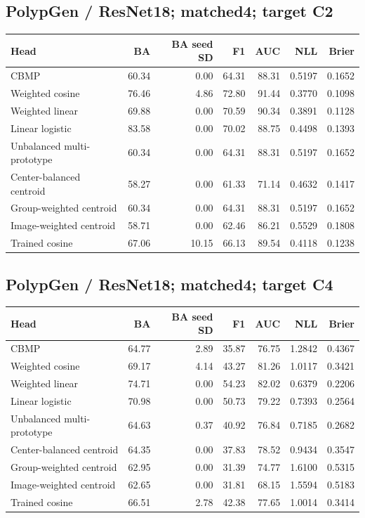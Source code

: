 \subsection*{PolypGen / ResNet18; matched4; target C2}
\begingroup\small\setlength{\tabcolsep}{3pt}
\begin{longtable}{lrrrrrr}
\toprule Head & BA & BA seed SD & F1 & AUC & NLL & Brier \\
\midrule
CBMP & 60.34 & 0.00 & 64.31 & 88.31 & 0.5197 & 0.1652 \\
Weighted cosine & 76.46 & 4.86 & 72.80 & 91.44 & 0.3770 & 0.1098 \\
Weighted linear & 69.88 & 0.00 & 70.59 & 90.34 & 0.3891 & 0.1128 \\
Linear logistic & 83.58 & 0.00 & 70.02 & 88.75 & 0.4498 & 0.1393 \\
Unbalanced multi-prototype & 60.34 & 0.00 & 64.31 & 88.31 & 0.5197 & 0.1652 \\
Center-balanced centroid & 58.27 & 0.00 & 61.33 & 71.14 & 0.4632 & 0.1417 \\
Group-weighted centroid & 60.34 & 0.00 & 64.31 & 88.31 & 0.5197 & 0.1652 \\
Image-weighted centroid & 58.71 & 0.00 & 62.46 & 86.21 & 0.5529 & 0.1808 \\
Trained cosine & 67.06 & 10.15 & 66.13 & 89.54 & 0.4118 & 0.1238 \\
\bottomrule
\end{longtable}
\endgroup
\subsection*{PolypGen / ResNet18; matched4; target C4}
\begingroup\small\setlength{\tabcolsep}{3pt}
\begin{longtable}{lrrrrrr}
\toprule Head & BA & BA seed SD & F1 & AUC & NLL & Brier \\
\midrule
CBMP & 64.77 & 2.89 & 35.87 & 76.75 & 1.2842 & 0.4367 \\
Weighted cosine & 69.17 & 4.14 & 43.27 & 81.26 & 1.0117 & 0.3421 \\
Weighted linear & 74.71 & 0.00 & 54.23 & 82.02 & 0.6379 & 0.2206 \\
Linear logistic & 70.98 & 0.00 & 50.73 & 79.22 & 0.7393 & 0.2564 \\
Unbalanced multi-prototype & 64.63 & 0.37 & 40.92 & 76.84 & 0.7185 & 0.2682 \\
Center-balanced centroid & 64.35 & 0.00 & 37.83 & 78.52 & 0.9434 & 0.3547 \\
Group-weighted centroid & 62.95 & 0.00 & 31.39 & 74.77 & 1.6100 & 0.5315 \\
Image-weighted centroid & 62.65 & 0.00 & 31.81 & 68.15 & 1.5594 & 0.5183 \\
Trained cosine & 66.51 & 2.78 & 42.38 & 77.65 & 1.0014 & 0.3414 \\
\bottomrule
\end{longtable}
\endgroup
